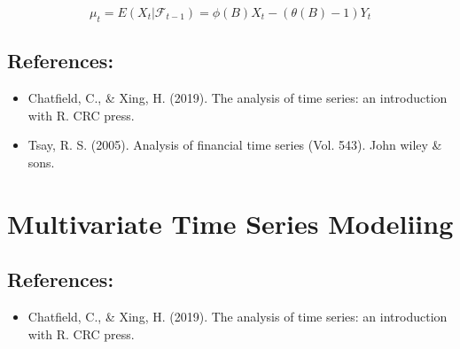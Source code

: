 \documentclass[]{book}
\providecommand{\tightlist}{%
  \setlength{\itemsep}{0pt}\setlength{\parskip}{0pt}}
\begin{document}
\[\mu_t=E(X_t|\mathcal{F}_{t-1})= \phi(B)X_t-(\theta(B)-1)Y_t\]

\hypertarget{references-2}{%
\section{References:}\label{references-2}}

\begin{itemize}
\item
  Chatfield, C., \& Xing, H. (2019). The analysis of time series: an introduction with R. CRC press.
\item
  Tsay, R. S. (2005). Analysis of financial time series (Vol. 543). John wiley \& sons.
  \newpage
\end{itemize}

\hypertarget{multivariate-time-series-modeliing}{%
\chapter{Multivariate Time Series Modeliing}\label{multivariate-time-series-modeliing}}


\hypertarget{references-3}{%
\section{References:}\label{references-3}}

\begin{itemize}
\tightlist
\item
  Chatfield, C., \& Xing, H. (2019). The analysis of time series: an introduction with R. CRC press.
\end{itemize}


\end{document}
